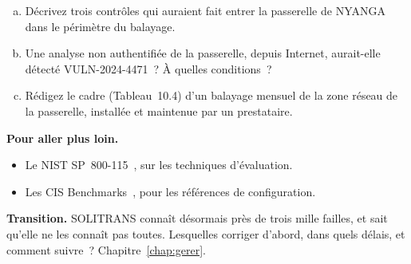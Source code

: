 \begin{boxexo}[title={\ding{45}\quad Exercice~10.4. La passerelle invisible \niveauexpert}]
\begin{enumerate}[(a)]
    \item Décrivez trois contrôles qui auraient fait entrer la passerelle de
          NYANGA dans le périmètre du balayage.
    \item Une analyse non authentifiée de la passerelle, depuis Internet,
          aurait-elle détecté VULN-2024-4471~? À quelles conditions~?
    \item Rédigez le cadre (Tableau~10.4) d'un balayage mensuel de la
          zone réseau de la passerelle, installée et maintenue par un
          prestataire.
\end{enumerate}
\end{boxexo}

\bigskip

\begin{boxinfo}
\textbf{Pour aller plus loin.}
\begin{itemize}
    \item Le NIST SP~800-115~\cite{nist800115}, sur les techniques
          d'évaluation.
    \item Les CIS Benchmarks~\cite{cis2026benchmarks}, pour les références
          de configuration.
\end{itemize}
\end{boxinfo}

\begin{boxinfo}
\textbf{Transition.} SOLITRANS connaît désormais près de trois mille
failles, et sait qu'elle ne les connaît pas toutes. Lesquelles corriger
d'abord, dans quels délais, et comment suivre~? Chapitre~\ref{chap:gerer}.
\end{boxinfo}
